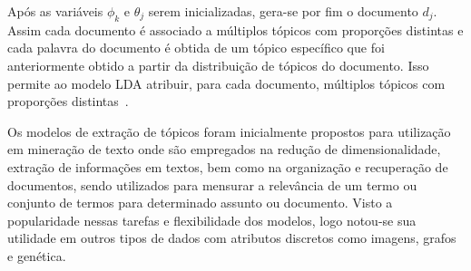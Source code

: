 Após as variáveis $\phi_k$ e $\theta_j$ serem inicializadas, gera-se por fim o documento $d_j$.
%
Assim cada documento é associado a múltiplos tópicos com proporções distintas e cada palavra do documento é obtida de um tópico específico que foi anteriormente obtido a partir da distribuição de tópicos do documento. Isso permite ao modelo LDA atribuir, para cada documento, múltiplos tópicos com proporções distintas~\cite{Blei2012, Faleiros2016}.















Os modelos de extração de tópicos foram inicialmente propostos para utilização em mineração de texto onde são empregados na redução de dimensionalidade, extração de informações em textos, bem como na organização e recuperação de documentos, sendo utilizados para mensurar a relevância de um termo ou conjunto de termos para determinado assunto ou documento. Visto a popularidade nessas tarefas e flexibilidade dos modelos, logo notou-se sua utilidade em outros tipos de dados com atributos discretos como imagens, grafos e genética. 


